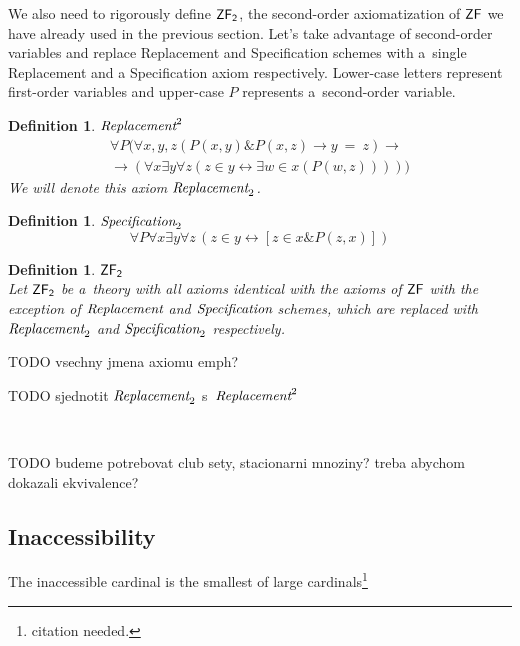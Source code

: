 \documentclass[12pt,a4paper]{article}
\newtheorem{definition}[theorem]{Definition}
\renewcommand{\iff}{\leftrightarrow}
\newcommand{\then}{\rightarrow}
\begin{document}
We also need to rigorously define $\sf{ZF}_2$, the second-order axiomatization of $\sf{ZF}$ we have already used in the previous section. Let's take advantage of second-order variables and replace Replacement and Specification schemes with a~single Replacement and a Specification axiom respectively. Lower-case letters represent first-order variables and upper-case $P$ represents a~second-order variable. \cite{Shapiro87}
\begin{definition}{$\emph{Replacement}^2$}\label{def:replacement_2}\\
\begin{equation}
\begin{split}
\forall P (\forall x, y, z (P(x, y) \& P(x, z) \then y\ =\ z) \then
\\
\then (\forall x \exists y \forall z (z \in y \iff \exists w \in x (P(w, z)))))
\end{split}
\end{equation}
We will denote this axiom $\emph{Replacement}_2$.
\end{definition}

\begin{definition}{$\emph{Specification}_2$}\\
\begin{equation}
\forall P \forall x \exists y \forall z \, ( z \in y \iff [ z \in x \& P(z, x) ] )
\end{equation}
\end{definition}

\begin{definition}{$\sf{ZF}_2$}\\
Let $\sf{ZF}_2$ be a~theory with all axioms identical with the axioms of $\sf{ZF}$ with the exception of $\emph{Replacement}$ and $\emph{Specification}$ schemes, which are replaced with $\emph{Replacement}_2$ and $\emph{Specification}_2$ respectively.
\end{definition}

TODO vsechny jmena axiomu emph?

TODO sjednotit $\emph{Replacement}_2$ s~$\emph{Replacement}^2$

\

TODO budeme potrebovat club sety, stacionarni mnoziny? treba abychom dokazali ekvivalence?


\subsection{Inaccessibility}\label{section:inaccessibility}
The inaccessible cardinal is the smallest of large cardinals\footnote{citation needed.}
\end{document}
